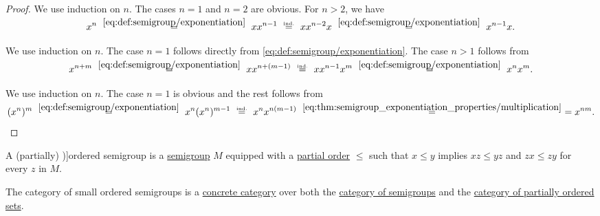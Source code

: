\begin{proof}
   We use induction on \( n \). The cases \( n = 1 \) and \( n = 2 \) are obvious. For \( n > 2 \), we have
  \begin{equation*}
    x^n
    \reloset {\eqref{eq:def:semigroup/exponentiation}} =
    x x^{n-1}
    \reloset {\T{ind.}} =
    x x^{n-2} x
    \reloset {\eqref{eq:def:semigroup/exponentiation}} =
    x^{n-1} x.
  \end{equation*}

   We use induction on \( n \). The case \( n = 1 \) follows directly from \eqref{eq:def:semigroup/exponentiation}. The case \( n > 1 \) follows from
  \begin{equation*}
    x^{n + m}
    \reloset {\eqref{eq:def:semigroup/exponentiation}} =
    x x^{n + (m - 1)}
    \reloset {\T{ind.}} =
    x x^{n-1} x^m
    \reloset {\eqref{eq:def:semigroup/exponentiation}} =
    x^n x^m.
  \end{equation*}

   We use induction on \( n \). The case \( n = 1 \) is obvious and the rest follows from
  \begin{equation*}
    (x^n)^m
    \reloset {\eqref{eq:def:semigroup/exponentiation}} =
    x^n (x^n)^{m-1}
    \reloset {\T{ind.}} =
    x^n x^{n (m - 1)}
    \reloset {\eqref{eq:thm:semigroup_exponentiation_properties/multiplication}} =
    =
    x^{nm}.
  \end{equation*}
\end{proof}

\begin{definition}\label{def:ordered_semigroup}
  A (partially) \term[ru=частично упорядоченная полугруппа (\cite[535]{Ляпин1960})]{ordered semigroup} is a \hyperref[def:semigroup]{semigroup} \( M \) equipped with a \hyperref[def:partially_ordered_set]{partial order} \( \leq \) such that \( x \leq y \) implies \( xz \leq yz \) and \( zx \leq zy \) for every \( z \) in \( M \).
\end{definition}
\begin{comments}
  \item The category of small ordered semigroups is a \hyperref[def:concrete_category]{concrete category} over both the \hyperref[def:semigroup/category]{category of semigroups} and the \hyperref[def:partially_ordered_set]{category of partially ordered sets}.
\end{comments}


